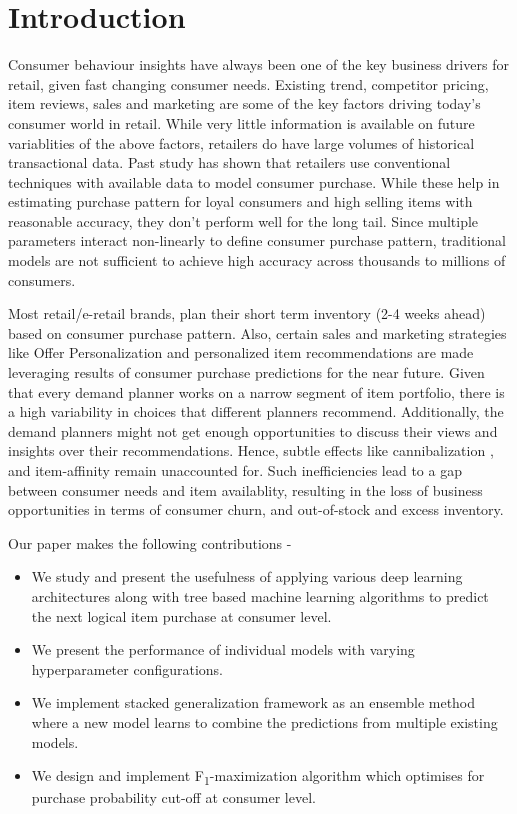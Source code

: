 \section{Introduction}
Consumer behaviour insights have always been one of the key business drivers for retail, given
fast changing consumer needs. Existing trend, competitor pricing, item reviews, sales and marketing are some of the 
key factors driving today's consumer world in retail. While very little information is available
on future variablities of the above factors, retailers do have large volumes of historical transactional data. Past study 
\cite{choudhury2019machine} has shown that retailers use conventional techniques with available data to model consumer purchase. 
While these help in estimating purchase pattern for loyal consumers and high selling items with reasonable accuracy, they 
don't perform well for the long tail. Since multiple parameters interact non-linearly to define consumer purchase pattern,
traditional models are not sufficient to achieve high accuracy across thousands to millions of consumers.

Most retail/e-retail brands, plan their short term inventory (2-4 weeks ahead)  based on consumer 
purchase pattern. Also, certain sales and marketing strategies like Offer Personalization and personalized item
recommendations are made leveraging results of consumer purchase predictions for the near future.
Given that every demand planner works on a narrow segment of item portfolio, there is a high 
variability in choices that different planners recommend. Additionally, the demand planners might not get enough opportunities 
to discuss their views and insights over their recommendations. Hence, subtle effects like cannibalization
\cite{shah2007retailer}, and item-affinity remain unaccounted for. Such inefficiencies lead to a gap between consumer needs 
and item availablity, resulting in the loss of business opportunities in terms of consumer churn, and out-of-stock
and excess inventory.

Our paper makes the following contributions -
\begin{itemize}
\item We study and present the usefulness of applying various deep learning architectures along with tree based machine 
learning algorithms to predict the next logical item purchase at consumer level.
\item We present the performance of individual models with varying hyperparameter configurations.
\item We implement stacked generalization framework \cite{wolpert1992stacked} as an ensemble method where a new model learns 
to combine the predictions from multiple existing models.
\item We design and implement F\textsubscript{1}-maximization algorithm which optimises for purchase probability cut-off 
at consumer level.
\end{itemize}

